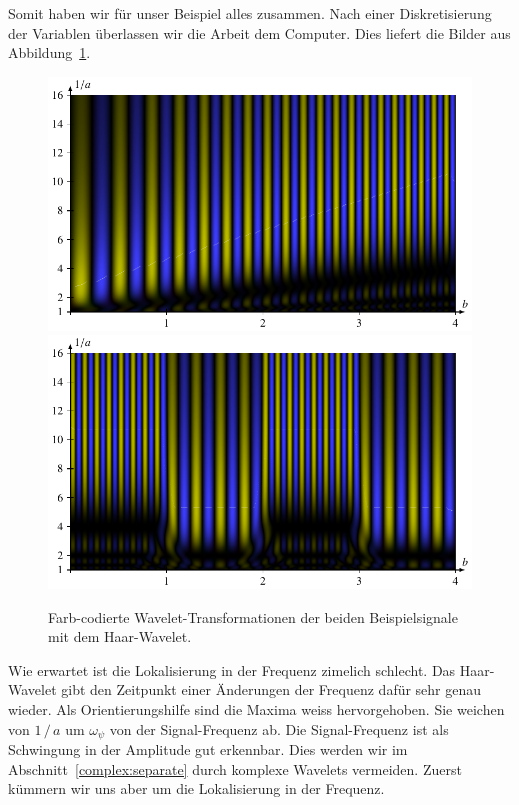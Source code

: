 Somit haben wir für unser Beispiel alles zusammen.
Nach einer Diskretisierung der Variablen überlassen wir die Arbeit dem Computer.
Dies liefert die Bilder aus Abbildung~\ref{complex:haar-ex}.
\begin{figure}
	\centering
	\includegraphics{papers/complex/images/chirp_haar.pdf}
	\includegraphics{papers/complex/images/square_haar.pdf}
	\caption{Farb-codierte Wavelet-Transformationen der beiden Beispielsignale mit dem Haar-Wavelet.}
	\label{complex:haar-ex}
\end{figure}

Wie erwartet ist die Lokalisierung in der Frequenz zimelich schlecht.
Das Haar-Wavelet gibt den Zeitpunkt einer Änderungen der Frequenz dafür sehr genau wieder.
Als Orientierungshilfe sind die Maxima weiss hervorgehoben.
Sie weichen von $1\,/\,a$ um $\omega_\psi$ von der Signal-Frequenz ab.
Die Signal-Frequenz ist als Schwingung in der Amplitude gut erkennbar.
Dies werden wir im Abschnitt~\ref{complex:separate} durch komplexe Wavelets vermeiden.
Zuerst kümmern wir uns aber um die Lokalisierung in der Frequenz.

